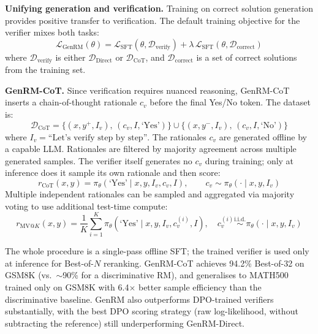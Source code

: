 \textbf{Unifying generation and verification.} Training on correct solution generation provides positive transfer to verification. The default training objective for the verifier mixes both tasks:
\begin{equation}
    \mathcal{L}_{\text{GenRM}}(\theta) = \mathcal{L}_{\text{SFT}}(\theta, \mathcal{D}_{\text{verify}}) + \lambda\,\mathcal{L}_{\text{SFT}}(\theta, \mathcal{D}_{\text{correct}})
    \label{eq:genrm}
\end{equation}
where $\mathcal{D}_{\text{verify}}$ is either $\mathcal{D}_{\text{Direct}}$ or $\mathcal{D}_{\text{CoT}}$, and $\mathcal{D}_{\text{correct}}$ is a set of correct solutions from the training set.

\textbf{GenRM-CoT.} Since verification requires nuanced reasoning, GenRM-CoT inserts a chain-of-thought rationale $c_v$ before the final Yes/No token. The dataset is:
\begin{equation*}
    \mathcal{D}_{\text{CoT}} = \bigl\{(x, y^+, I_v),\,(c_v, I, \text{`Yes'})\bigr\} \cup \bigl\{(x, y^-, I_v),\,(c_v, I, \text{`No'})\bigr\}
\end{equation*}
where $I_v = \text{``Let's verify step by step''}$. The rationales $c_v$ are generated offline by a capable LLM. Rationales are filtered by majority agreement across multiple generated samples. The verifier itself generates no $c_v$ during training; only at inference does it sample its own rationale and then score:
\begin{equation}
    r_{\text{CoT}}(x, y) = \pi_\theta(\text{`Yes'} \mid x, y, I_v, c_v, I), \qquad c_v \sim \pi_\theta(\cdot \mid x, y, I_v)
    \label{eq:genrm_cot}
\end{equation}
Multiple independent rationales can be sampled and aggregated via majority voting to use additional test-time compute:
\begin{equation}
    r_{\text{MV}@K}(x,y) = \frac{1}{K}\sum_{i=1}^{K} \pi_\theta\!\left(\text{`Yes'} \mid x, y, I_v, c_v^{(i)}, I\right), \quad c_v^{(i)} \overset{\text{i.i.d.}}{\sim} \pi_\theta(\cdot \mid x, y, I_v)
    \label{eq:genrm_mv}
\end{equation}

The whole procedure is a single-pass offline SFT; the trained verifier is used only at inference for Best-of-$N$ reranking. GenRM-CoT achieves 94.2\% Best-of-32 on GSM8K (vs.\ $\sim$90\% for a discriminative RM), and generalises to MATH500 trained only on GSM8K with 6.4$\times$ better sample efficiency than the discriminative baseline. GenRM also outperforms DPO-trained verifiers substantially, with the best DPO scoring strategy (raw log-likelihood, without subtracting the reference) still underperforming GenRM-Direct.

